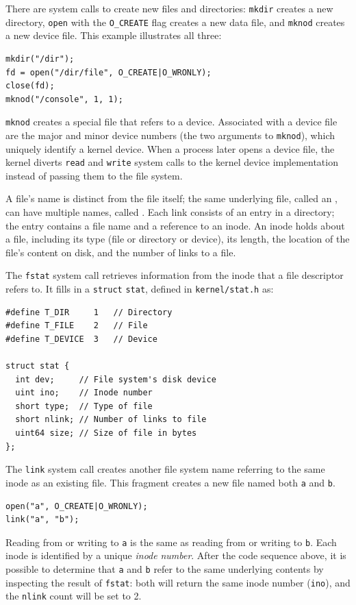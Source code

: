 There are system calls to create new files and directories:
\lstinline{mkdir}
creates a new directory,
\lstinline{open}
with the
\lstinline{O_CREATE}
flag creates a new data file,
and
\lstinline{mknod}
creates a new device file.
This example illustrates all three:
\begin{lstlisting}[]
mkdir("/dir");
fd = open("/dir/file", O_CREATE|O_WRONLY);
close(fd);
mknod("/console", 1, 1);
\end{lstlisting}
\lstinline{mknod}
creates a special file that refers to a device.
Associated with a device file are
the major and minor device numbers
(the two arguments to
\lstinline{mknod}),
which uniquely identify a kernel device.
When a process later opens a device file, the kernel
diverts
\lstinline{read}
and
\lstinline{write}
system calls to the kernel device implementation
instead of passing them to the file system.

A file's name is distinct from the file itself;
the same underlying file, called an
,
can have multiple names,
called
.
Each link consists of an entry in a directory;
the entry contains a file name and a reference
to an inode.
An inode holds
about a file, including
its type (file or directory or device),
its length,
the location of the file's content on disk,
and the number of links to a file.

The
\lstinline{fstat}
system call
retrieves information from the inode that a
file descriptor refers to.
It fills in a
\lstinline{struct}
\lstinline{stat},
defined in
\texttt{kernel/stat.h}
as:
\begin{lstlisting}[]
#define T_DIR     1   // Directory
#define T_FILE    2   // File
#define T_DEVICE  3   // Device

struct stat {
  int dev;     // File system's disk device
  uint ino;    // Inode number
  short type;  // Type of file
  short nlink; // Number of links to file
  uint64 size; // Size of file in bytes
};
\end{lstlisting}

The
\lstinline{link}
system call creates another file system name
referring to the same inode as an existing file.
This fragment creates a new file named both
\lstinline{a}
and
\lstinline{b}.
\begin{lstlisting}[]
open("a", O_CREATE|O_WRONLY);
link("a", "b");
\end{lstlisting}
Reading from or writing to
\lstinline{a}
is the same as reading from or writing to
\lstinline{b}.
Each inode is identified by a unique
\textit{inode}
\textit{number}.
After the code sequence above, it is possible
to determine that
\lstinline{a}
and
\lstinline{b}
refer to the same underlying contents by inspecting the
result of
\lstinline{fstat}:
both will return the same inode number
(\lstinline{ino}),
and the
\lstinline{nlink}
count will be set to 2.


